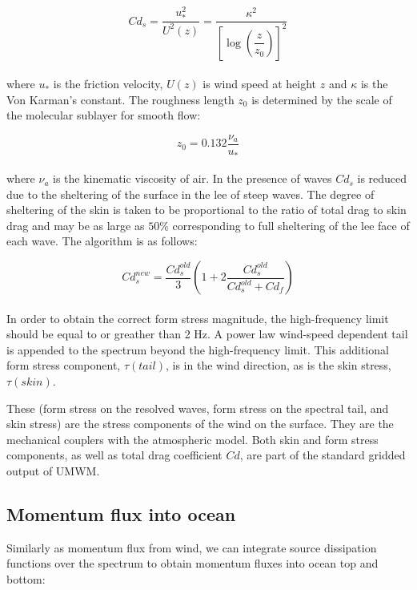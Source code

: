 \documentclass[letterpaper]{article}
\numberwithin{equation}{section}
\begin{document}
\begin{equation}
Cd_{s} = \dfrac{u_{*}^{2}}{U^{2}(z)} = \dfrac{\kappa^{2}}{\left[\log{\left(\dfrac{z}{z_{0}}\right)}\right]^{2}}
\end{equation}
\\
where $u_{*}$ is the friction velocity, $U(z)$ is wind speed at height $z$ and $\kappa$ is the Von Karman's constant.
The roughness length $z_0$ is determined by the scale of the molecular sublayer for smooth flow:

\begin{equation}
z_{0} = 0.132\dfrac{\nu_{a}}{u_{*}} 
\end{equation}
\\
where $\nu_{a}$ is the kinematic viscosity of air.
In the presence of waves $Cd_{s}$ is reduced due to the sheltering of the surface in the lee of steep waves. 
The degree of sheltering of the skin is taken to be proportional to the ratio of total drag to skin drag 
and may be as large as $50\%$ corresponding to full sheltering of the lee face of each wave. 
The algorithm is as follows:

\begin{equation}
Cd_{s}^{new}=\dfrac{Cd_{s}^{old}}{3}\left(1+2\dfrac{Cd_{s}^{old}}{Cd_{s}^{old}+Cd_{f}}\right)
\end{equation}
\\
In order to obtain the correct form stress magnitude,
the high-frequency limit should be equal to or greather than 2 Hz.
A power law wind-speed dependent tail is appended to the spectrum
beyond the high-frequency limit. This additional form stress component, $\tau(tail)$, is in the wind direction, as is the skin stress, $\tau(skin)$.  

These (form stress on the resolved waves, form stress on the spectral tail, and skin stress) are the stress components of the wind on the surface.  
They are the mechanical couplers with the atmospheric model.
Both skin and form stress components, as well as total drag coefficient $Cd$,
are part of the standard gridded output of UMWM.

\subsection{Momentum flux into ocean}
\label{sec:ocean_stress}

Similarly as momentum flux from wind, we can integrate source dissipation
functions  over the spectrum to obtain momentum fluxes into ocean top and bottom:
\end{document}
